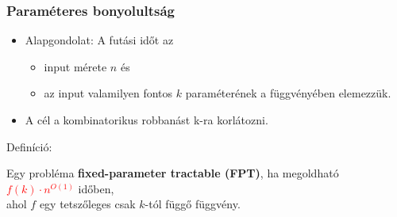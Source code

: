 \begin{frame}
\frametitle{Paraméteres bonyolultság}

\begin{itemize}
\item Alapgondolat: A futási időt az 
\begin{itemize}
\item input mérete $n$ és
\item az input valamilyen fontos $k$ paraméterének a függvényében elemezzük.
\end{itemize}
\item A cél a kombinatorikus robbanást k-ra korlátozni.
\end{itemize}
\emptyline

Definíció:

Egy probléma \textbf{fixed-parameter tractable (FPT)}, ha megoldható \textcolor{red}{$f(k)\cdot{}n^{O(1)}$} időben,\\
ahol $f$ egy tetszőleges csak $k$-tól függő függvény.

\end{frame}
